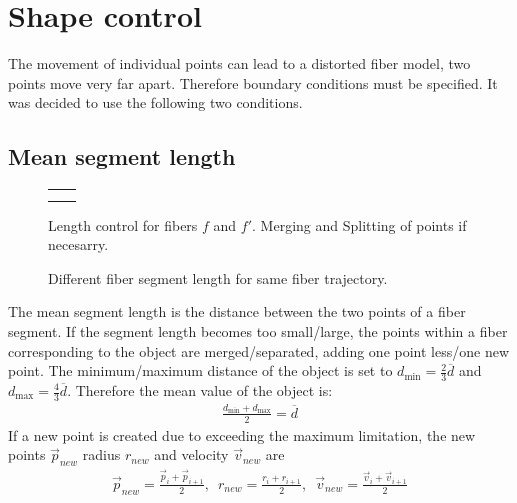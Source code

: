 \section{Shape control}\label{chap5:ShapeControl}
The movement of individual points can lead to a distorted fiber model, \eg{} two points move very far apart.
Therefore boundary conditions must be specified.
It was decided to use the following two conditions.
%
% 
% 
\subsection{Mean segment length}
%
\begin{figure}[!t]
    \centering
    \tikzset{external/export=false}
    \def\forcetikzscale{true}
    \setlength{\tabcolsep}{0pt}
    \setlength{\tikzwidth}{.45\textwidth}
    \begin{tabular}{C{.5\textwidth}C{.5\textwidth}}
     &
     \\
     &
    \end{tabular}
	\caption{Length control for fibers $f$ and $f'$. Merging and Splitting of points if necesarry.}
	\label{fig:mergeSplit}
\end{figure}
%
%
\begin{figure}[!t]
    \centering
    \setlength{\tikzwidth}{0.75\textwidth}
	\caption{Different fiber segment length for same fiber trajectory.}
	\label{fig:modelLength}
\end{figure}
%
The mean segment length is the distance between the two points of a fiber segment.
If the segment length becomes too small/large, the points within a fiber corresponding to the object are merged/separated, adding one point less/one new point.
The minimum/maximum distance of the object is set to $d_{\min} = \frac{2}{3} \overline{d}$ and $d_{\max} = \frac{4}{3}\overline{d}$.
Therefore the mean value of the object is:
\begin{align}
\frac{d_{\min} + d_{\max}}{2} = \overline{d}
\end{align}
%
If a new point is created due to exceeding the maximum limitation, the new points $\vec{p}_{new}$ radius $r_{new}$ and velocity $\vec{v}_{new}$ are
\begin{align}
\vec{p}_{new} = \frac{\vec{p}_{i} + \vec{p}_{i+1}}{2},\enspace
r_{new} = \frac{r_{i} + r_{i+1}}{2},\enspace
\vec{v}_{new} = \frac{\vec{v}_{i} + \vec{v}_{i+1}}{2}
\end{align}
%
% 
% 
